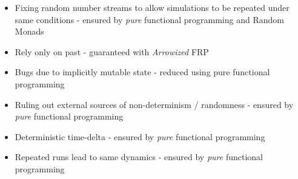\begin{itemize}
	\item Fixing random number streams to allow simulations to be repeated under same conditions - ensured by \textit{pure} functional programming and Random Monads
	\item Rely only on past - guaranteed with \textit{Arrowized} FRP
	\item Bugs due to implicitly mutable state - reduced using pure functional programming
	\item Ruling out external sources of non-determinism / randomness - ensured by \textit{pure} functional programming
	\item Deterministic time-delta - ensured by \textit{pure} functional programming
	\item Repeated runs lead to same dynamics - ensured by \textit{pure} functional programming
\end{itemize}

